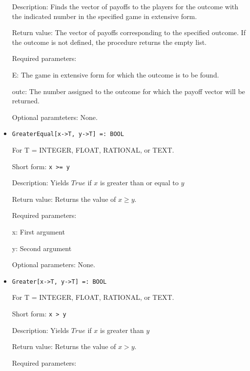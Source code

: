 \begin{itemize}
\bd
\item
[Description:] Finds the vector of payoffs to the players for the
outcome with the indicated number in the specified game in
extensive form.
\item
[Return value:] The vector of payoffs corresponding to the specified
outcome.  If the outcome is not defined, the procedure returns the
empty list.
\item
[Required parameters:]\hfil\null

\bd
\item
[E:] The game in extensive form for which the outcome is to be
found.
\item
[outc:] The number assigned to the outcome for which the payoff vector
will be returned.
\ed

\item
[Optional paramteters:] None.
\ed

\item
\protect \large \begin{verbatim}
GreaterEqual[x->T, y->T] =: BOOL
\end{verbatim}\normalsize

For T = INTEGER, FLOAT, RATIONAL, or TEXT.

\bd
\item
[Short form:] \verb+x >= y+
\item
[Description:] Yields $True$ if $x$ is greater than or equal to $y$
\item
[Return value:] Returns the value of $x \geq y$.
\item
[Required parameters:]\hfil\null

\bd
\item
[x:] First argument
\item
[y:] Second argument
\ed

\item
[Optional parameters:] None.
\ed

\item
\protect \large \begin{verbatim}
Greater[x->T, y->T] =: BOOL
\end{verbatim}\normalsize

For T = INTEGER, FLOAT, RATIONAL, or TEXT.

\bd
\item
[Short form:] \verb+x > y+
\item
[Description:] Yields $True$ if $x$ is greater than $y$
\item
[Return value:] Returns the value of $x > y$.
\item
[Required parameters:]\hfil\null


\end{itemize}
